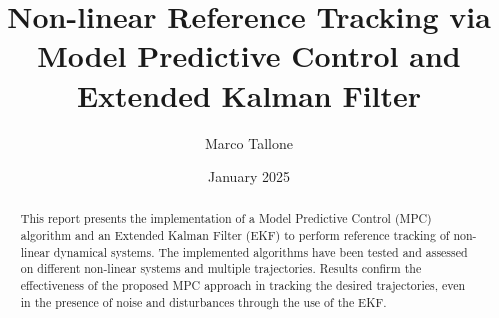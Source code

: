 \documentclass{settings/notex}
\title{Non-linear Reference Tracking via\\
	Model Predictive Control and Extended Kalman Filter\\
  \vspace{0.5cm}
  \fontsize{12pt}{12pt}\selectfont{
    Modelling and Control of Cyber-Physical Systems II\\
    \vspace{0.25cm}
    University of Trieste (UniTS)
  }
}
\author{Marco Tallone}
\date{January 2025}
\begin{document}
\maketitle

\begin{abstract}
\noindent
This report presents the implementation of a Model Predictive Control (MPC)
algorithm and an Extended Kalman Filter (EKF) to perform reference tracking of
non-linear dynamical systems. The implemented algorithms have been tested and assessed on different non-linear systems and multiple
trajectories. Results confirm the effectiveness of the proposed MPC approach in
tracking the desired trajectories, even in the presence of noise and
disturbances through the use of the EKF.
\end{abstract}










\pagebreak



\pagebreak
\appendix
\renewcommand{\thesection}{\Alph{section}} %
\renewcommand{\thesubsection}{\thesection\arabic{subsection}} %

\end{document}
